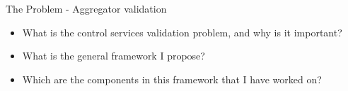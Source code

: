 The Problem -  Aggregator validation
\begin{itemize}
	\item What is the control services validation problem, and why is it important?
	\item What is the general framework I propose?
	\item Which are the components in this framework that I have worked on?
\end{itemize}

